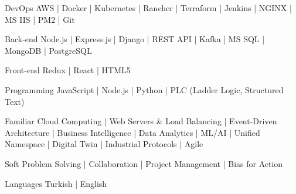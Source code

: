 

\begin{cvskills}

  \cvskill
    {DevOps} %
    {AWS | Docker | Kubernetes | Rancher | Terraform | Jenkins | NGINX | MS IIS | PM2 | Git } %

  \cvskill
    {Back-end} %
    {Node.js | Express.js | Django | REST API | Kafka | MS SQL | MongoDB | PostgreSQL} %

  \cvskill
    {Front-end} %
    {Redux | React | HTML5} %

  \cvskill
    {Programming} %
    {JavaScript | Node.js | Python | PLC (Ladder Logic, Structured Text)} %

  \cvskill
    {Familiar} %
    {Cloud Computing | Web Servers \& Load Balancing | Event-Driven Architecture | Business Intelligence | Data Analytics | ML/AI |  Unified Namespace | Digital Twin | Industrial Protocols | Agile} %

  \cvskill
    {Soft} %
    {Problem Solving | Collaboration | Project Management | Bias for Action} %
    
  \cvskill
    {Languages} %
    {Turkish | English} %

\end{cvskills}